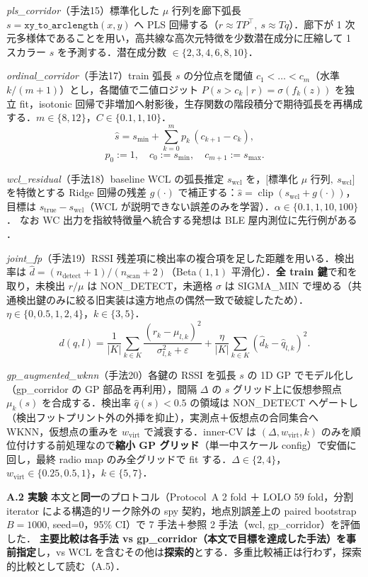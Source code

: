 \documentclass[a4paper,twocolumn]{ltjsarticle}
\begin{document}
\smallskip\noindent\textit{pls\_corridor}（手法15）\;標準化した $\mu$ 行列を廊下弧長 $s=\texttt{xy\_to\_arclength}(x,y)$ へ PLS 回帰する（$r\approx TP^\top,\ s\approx Tq$）．廊下が 1 次元多様体であることを用い，高共線な高次元特徴を少数潜在成分に圧縮して 1 スカラー $s$ を予測する．潜在成分数 $\in\{2,3,4,6,8,10\}$．

\smallskip\noindent\textit{ordinal\_corridor}（手法17）\;train 弧長 $s$ の分位点を閾値 $c_1<\dots<c_m$（水準 $k/(m{+}1)$）とし，各閾値で二値ロジット $P(s>c_k\mid r)=\sigma(f_k(z))$ を独立 fit，isotonic 回帰で非増加へ射影後，生存関数の階段積分で期待弧長を再構成する．$m\in\{8,12\}$，$C\in\{0.1,1,10\}$．
\[
  \hat s=s_{\min}+\sum_{k=0}^{m}p_k\,(c_{k+1}-c_k),
\]
\[
  p_0:=1,\quad c_0:=s_{\min},\quad c_{m+1}:=s_{\max}.
\]

\smallskip\noindent\textit{wcl\_residual}（手法18）\;baseline WCL の弧長推定 $s_{\mathrm{wcl}}$ を，$[$標準化 $\mu$ 行列$,\ s_{\mathrm{wcl}}]$ を特徴とする Ridge 回帰の残差 $g(\cdot)$ で補正する：$\hat s=\operatorname{clip}(s_{\mathrm{wcl}}+g(\cdot))$，目標は $s_{\text{true}}-s_{\mathrm{wcl}}$（WCL が説明できない誤差のみを学習）．$\alpha\in\{0.1,1,10,100\}$．
なお WC 出力を指紋特徴量へ統合する発想は BLE 屋内測位に先行例がある \cite{subedi2017,subedi2019}．

\smallskip\noindent\textit{joint\_fp}（手法19）\;RSSI 残差項に検出率の複合項を足した距離を用いる．検出率は $\hat d=(n_{\text{detect}}{+}1)/(n_{\text{scan}}{+}2)$（Beta$(1,1)$ 平滑化）．\textbf{全 train 鍵}で和を取り，未検出 $r/\mu$ は NON\_DETECT，未適格 $\sigma$ は SIGMA\_MIN で埋める（共通検出鍵のみに絞る旧実装は遠方地点の偶然一致で破綻したため）．$\eta\in\{0,0.5,1,2,4\}$，$k\in\{3,5\}$．
\[
  d(q,l)=\frac1{|K|}\sum_{k\in K}\frac{(r_k-\mu_{l,k})^2}{\sigma_{l,k}^2+\varepsilon}
         +\frac{\eta}{|K|}\sum_{k\in K}(\hat d_k-\hat q_{l,k})^2.
\]

\smallskip\noindent\textit{gp\_augmented\_wknn}（手法20）\;各鍵の RSSI を弧長 $s$ の 1D GP でモデル化し（gp\_corridor の GP 部品を再利用），間隔 $\Delta$ の $s$ グリッド上に仮想参照点 $\mu_k(s)$ を合成する．検出率 $\hat q(s)<0.5$ の領域は NON\_DETECT へゲートし（検出フットプリント外の外挿を抑止），実測点＋仮想点の合同集合へ WKNN，仮想点の重みを $w_{\text{virt}}$ で減衰する．inner-CV は $(\Delta,w_{\text{virt}},k)$ のみを順位付けする前処理なので\textbf{縮小 GP グリッド}（単一中スケール config）で安価に回し，最終 radio map のみ全グリッドで fit する．$\Delta\in\{2,4\}$，$w_{\text{virt}}\in\{0.25,0.5,1\}$，$k\in\{5,7\}$．

\smallskip\noindent\textbf{A.2\; 実験}\;
本文と\textbf{同一}のプロトコル（Protocol~A 2 fold ＋ LOLO 59 fold，分割 iterator による構造的リーク除外の spy 契約，地点別誤差上の paired bootstrap $B{=}1000$, seed=0，95\% CI）で 7 手法＋参照 2 手法（wcl, gp\_corridor）を評価した．
\textbf{主要比較は各手法 vs gp\_corridor（本文で目標を達成した手法）を事前指定}し，vs WCL を含むその他は\textbf{探索的}とする．多重比較補正は行わず，探索的比較として読む（A.5）．
\end{document}
